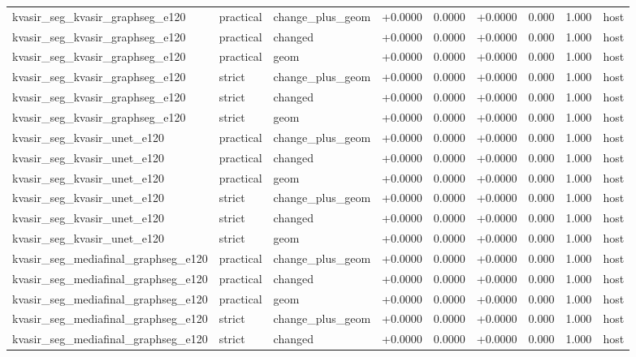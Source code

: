 \begin{table}[t]
\begin{tabular}{lllllllll}
kvasir\_seg\_kvasir\_graphseg\_e120 & practical & change\_plus\_geom & +0.0000 & 0.0000 & +0.0000 & 0.000 & 1.000 & host \\
kvasir\_seg\_kvasir\_graphseg\_e120 & practical & changed & +0.0000 & 0.0000 & +0.0000 & 0.000 & 1.000 & host \\
kvasir\_seg\_kvasir\_graphseg\_e120 & practical & geom & +0.0000 & 0.0000 & +0.0000 & 0.000 & 1.000 & host \\
kvasir\_seg\_kvasir\_graphseg\_e120 & strict & change\_plus\_geom & +0.0000 & 0.0000 & +0.0000 & 0.000 & 1.000 & host \\
kvasir\_seg\_kvasir\_graphseg\_e120 & strict & changed & +0.0000 & 0.0000 & +0.0000 & 0.000 & 1.000 & host \\
kvasir\_seg\_kvasir\_graphseg\_e120 & strict & geom & +0.0000 & 0.0000 & +0.0000 & 0.000 & 1.000 & host \\
kvasir\_seg\_kvasir\_unet\_e120 & practical & change\_plus\_geom & +0.0000 & 0.0000 & +0.0000 & 0.000 & 1.000 & host \\
kvasir\_seg\_kvasir\_unet\_e120 & practical & changed & +0.0000 & 0.0000 & +0.0000 & 0.000 & 1.000 & host \\
kvasir\_seg\_kvasir\_unet\_e120 & practical & geom & +0.0000 & 0.0000 & +0.0000 & 0.000 & 1.000 & host \\
kvasir\_seg\_kvasir\_unet\_e120 & strict & change\_plus\_geom & +0.0000 & 0.0000 & +0.0000 & 0.000 & 1.000 & host \\
kvasir\_seg\_kvasir\_unet\_e120 & strict & changed & +0.0000 & 0.0000 & +0.0000 & 0.000 & 1.000 & host \\
kvasir\_seg\_kvasir\_unet\_e120 & strict & geom & +0.0000 & 0.0000 & +0.0000 & 0.000 & 1.000 & host \\
kvasir\_seg\_mediafinal\_graphseg\_e120 & practical & change\_plus\_geom & +0.0000 & 0.0000 & +0.0000 & 0.000 & 1.000 & host \\
kvasir\_seg\_mediafinal\_graphseg\_e120 & practical & changed & +0.0000 & 0.0000 & +0.0000 & 0.000 & 1.000 & host \\
kvasir\_seg\_mediafinal\_graphseg\_e120 & practical & geom & +0.0000 & 0.0000 & +0.0000 & 0.000 & 1.000 & host \\
kvasir\_seg\_mediafinal\_graphseg\_e120 & strict & change\_plus\_geom & +0.0000 & 0.0000 & +0.0000 & 0.000 & 1.000 & host \\
kvasir\_seg\_mediafinal\_graphseg\_e120 & strict & changed & +0.0000 & 0.0000 & +0.0000 & 0.000 & 1.000 & host \\

\end{tabular}
\end{table}
